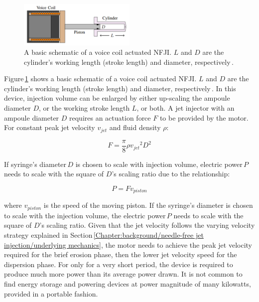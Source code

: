     
    \begin{figure}[!ht]
      \centering
      \includegraphics[width=0.5\textwidth]{chap2/images/vcm_for_nfji.png}
      \caption[LoF entry]{A basic schematic of a voice coil actuated \acs{NFJI}. $L$ and $D$ are the cylinder’s working length (stroke length) and diameter, respectively\,\cite{ruddy2014}.}
      \label{fig:chapter/background/vcm for nfji}
    \end{figure}
    
    
    Figure\,\ref{fig:chapter/background/vcm for nfji} shows a basic schematic of a voice coil actuated \acs{NFJI}. $L$ and $D$ are the cylinder’s working length (stroke length) and diameter, respectively\,\cite{ruddy2014}. In this device, injection volume can be enlarged by either up-scaling the ampoule diameter $D$, or the working stroke length $L$, or both. A jet injector with an ampoule diameter $D$ requires an actuation force $F$ to be provided by the motor. For constant peak jet velocity $v_{jet}$ and fluid density $\rho$:
    
    
    \begin{equation}
        F=\frac{\pi}{8}\rho {v_{jet}}^2 D^2
        \label{eq:force produce relationship in motor powered NFJI}
    \end{equation}
    
    
    If syringe’s diameter\,$D$ is chosen to scale with injection volume, electric power\,$P$ needs to scale with the square of $D$’s scaling ratio due to the relationship:
    
    
    \begin{equation}
        P=F v_{piston}
        \label{eq:power required for F and v_piston}
    \end{equation}
    
    
    where $v_{piston}$ is the speed of the moving piston. If the syringe’s diameter  is chosen to scale with the injection volume, the electric power\,$P$ needs to scale with the square of $D$’s scaling ratio. Given that the jet velocity follows the varying velocity strategy explained in Section\,\ref{Chapter:background/needle-free jet injection/underlying mechanics}, the motor needs to achieve the peak jet velocity required for the brief erosion phase, then the lower jet velocity speed for the dispersion phase. For only for a very short period, the device is required to produce much more power than its average power drawn. It is not common to find energy storage and powering devices at power magnitude of many kilowatts, provided in a portable fashion.
    

